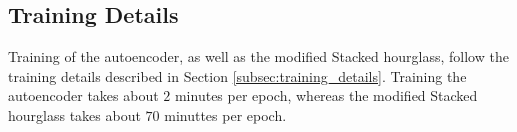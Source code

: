 \documentclass[./main.tex]{subfiles}
\begin{document}
\subsection{Training Details}\label{subsec:improv_train}
Training of the autoencoder, as well as the modified Stacked hourglass, follow the training details described in Section \ref{subsec:training_details}. Training the autoencoder takes about $2$ minutes per epoch, whereas the modified Stacked hourglass takes about $70$ minuttes per epoch.
\end{document}
